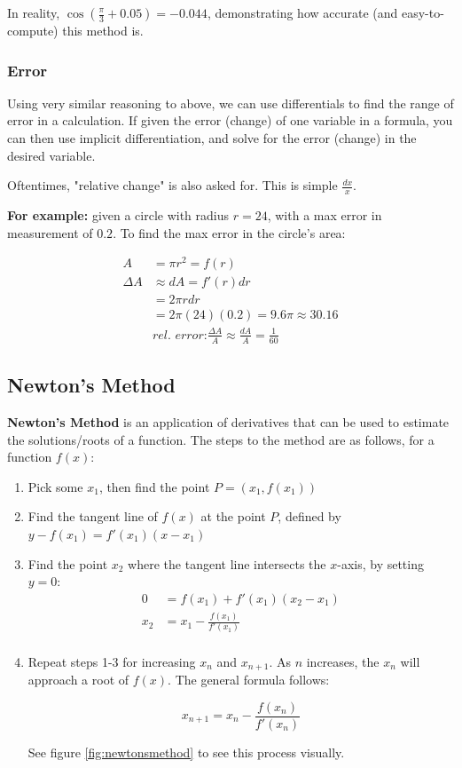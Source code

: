\documentclass[12pt]{article}
\begin{document}
In reality, $\cos(\frac{\pi}{3}+0.05) = -0.044$, demonstrating how accurate (and easy-to-compute) this method is.

\subsubsection{Error}
Using very similar reasoning to above, we can use differentials to find the range of error in a calculation. If given the error (change) of one variable in a formula, you can then use implicit differentiation, and solve for the error (change) in the desired variable.

Oftentimes, "relative change" is also asked for. This is simple $\frac{dx}{x}$.

\textbf{For example:} given a circle with radius $r=24$, with a max error in measurement of $0.2$. To find the max error in the circle's area:

\begin{equation}
    \begin{split}
        A &= \pi r^2 = f(r)\\
        \Delta A &\approx dA = f'(r) dr\\
        &= 2\pi r dr\\
        &= 2\pi(24)(0.2) = 9.6 \pi \approx 30.16\\
        &\textit{rel. error:} \frac{\Delta A}{A} \approx \frac{dA}{A} = \frac{1}{60}
    \end{split}
\end{equation}
\subsection{Newton's Method}
\textbf{Newton's Method} is an application of derivatives that can be used to estimate the solutions/roots of a function. The steps to the method are as follows, for a function $f(x)$:

\begin{enumerate}
    \item Pick some $x_1$, then find the point $P = (x_1, f(x_1))$
    \item Find the tangent line of $f(x)$ at the point $P$, defined by $y - f(x_1) = f'(x_1)(x-x_1)$
    \item Find the point $x_2$ where the tangent line intersects the $x$-axis, by setting $y=0$: 
    \begin{equation}
        \begin{split}
            0 &= f(x_1)+f'(x_1)(x_2-x_1)\\
            x_2 &= x_1 - \frac{f(x_1)}{f'(x_1)}\\
        \end{split}
    \end{equation}
    
    \item Repeat steps 1-3 for increasing $x_n$ and $x_{n+1}$. As $n$ increases, the $x_n$ will approach a root of $f(x)$. The general formula follows:
    
    $$x_{n+1} = x_{n} - \frac{f(x_n)}{f'(x_n)}$$
    
    See figure \ref{fig:newtonsmethod} to see this process visually.
\end{enumerate}
\end{document}
